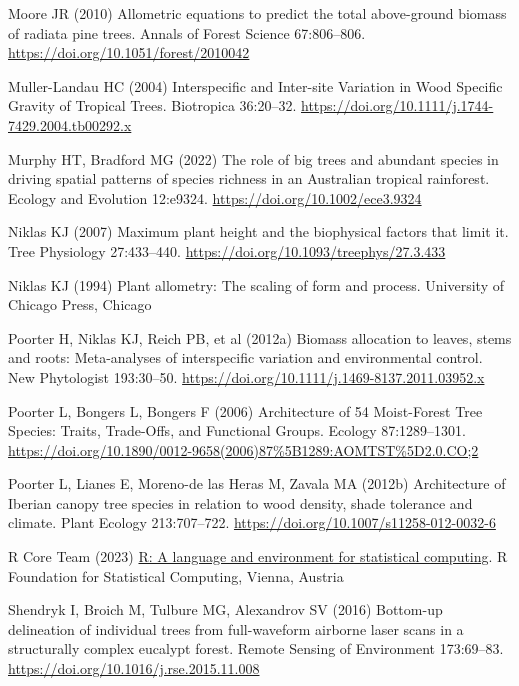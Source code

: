 \documentclass[
  12pt,
  letterpaper,
  DIV=11,
  numbers=noendperiod]{scrartcl}
\newlength{\cslhangindent}
\newenvironment{CSLReferences}[2] %
 {\begin{list}{}{%
  \setlength{\itemindent}{0pt}
  \setlength{\leftmargin}{0pt}
  \setlength{\parsep}{0pt}
  \ifodd #1
   \setlength{\leftmargin}{\cslhangindent}
   \setlength{\itemindent}{-1\cslhangindent}
  \fi
  \setlength{\itemsep}{#2\baselineskip}}}
 {\end{list}}
\begin{document}
\begin{CSLReferences}{1}{1}
Moore JR (2010) Allometric equations to predict the total above-ground
biomass of radiata pine trees. Annals of Forest Science 67:806--806.
\url{https://doi.org/10.1051/forest/2010042}

Muller-Landau HC (2004) Interspecific and {Inter}-site {Variation} in
{Wood} {Specific} {Gravity} of {Tropical} {Trees}. Biotropica 36:20--32.
\url{https://doi.org/10.1111/j.1744-7429.2004.tb00292.x}

Murphy HT, Bradford MG (2022) The role of big trees and abundant species
in driving spatial patterns of species richness in an {Australian}
tropical rainforest. Ecology and Evolution 12:e9324.
\url{https://doi.org/10.1002/ece3.9324}

Niklas KJ (2007) Maximum plant height and the biophysical factors that
limit it. Tree Physiology 27:433--440.
\url{https://doi.org/10.1093/treephys/27.3.433}

Niklas KJ (1994) Plant allometry: The scaling of form and process.
University of Chicago Press, Chicago

Poorter H, Niklas KJ, Reich PB, et al (2012a) Biomass allocation to
leaves, stems and roots: Meta-analyses of interspecific variation and
environmental control. New Phytologist 193:30--50.
\url{https://doi.org/10.1111/j.1469-8137.2011.03952.x}

Poorter L, Bongers L, Bongers F (2006) Architecture of 54
{Moist}-{Forest} {Tree} {Species}: {Traits}, {Trade}-{Offs}, and
{Functional} {Groups}. Ecology 87:1289--1301.
\url{https://doi.org/10.1890/0012-9658(2006)87\%5B1289:AOMTST\%5D2.0.CO;2}

Poorter L, Lianes E, Moreno-de las Heras M, Zavala MA (2012b)
Architecture of {Iberian} canopy tree species in relation to wood
density, shade tolerance and climate. Plant Ecology 213:707--722.
\url{https://doi.org/10.1007/s11258-012-0032-6}

R Core Team (2023) \href{https://www.R-project.org/}{R: A language and
environment for statistical computing}. R Foundation for Statistical
Computing, Vienna, Austria

Shendryk I, Broich M, Tulbure MG, Alexandrov SV (2016) Bottom-up
delineation of individual trees from full-waveform airborne laser scans
in a structurally complex eucalypt forest. Remote Sensing of Environment
173:69--83. \url{https://doi.org/10.1016/j.rse.2015.11.008}


\end{CSLReferences}
\end{document}
